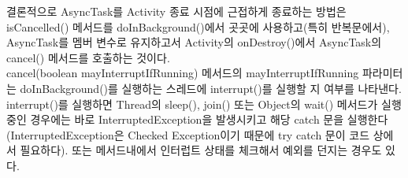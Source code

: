 결론적으로 AsyncTask를 Activity 종료 시점에 근접하게 종료하는 방법은 isCancelled() 메서드를 doInBackground()에서 곳곳에 사용하고(특히 반복문에서), AsyncTask를 멤버 변수로 유지하고서 Activity의 onDestroy()에서 AsyncTask의 cancel() 메서드를 호출하는 것이다.\\

cancel(boolean mayInterruptIfRunning) 메서드의 mayInterruptIfRunning 파라미터는 doInBackground()를 실행하는 스레드에  interrupt()를 실행할 지 여부를 나타낸다. 
interrupt()를 실행하면 Thread의 sleep(), join() 또는 Object의 wait() 메서드가 실행 중인 경우에는 바로 InterruptedException을 발생시키고 해당 catch 문을 실행한다(InterruptedException은 Checked Exception이기 때문에 try catch 문이 코드 상에서 필요하다). 
또는 메서드내에서 인터럽트 상태를 체크해서 예외를 던지는 경우도 있다.\\

